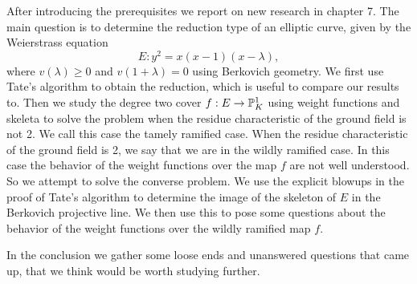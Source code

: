 \medskip


After introducing the prerequisites we report on new research in chapter 7. 
The main question is to determine the reduction type of an elliptic curve, given by the Weierstrass equation \[
	E: y^2 = x(x-1)(x-\lambda)
,\] 
where $v(\lambda) \ge 0$ and $v(1 + \lambda) = 0$ using Berkovich geometry.
We first use Tate's algorithm to obtain the reduction, which is useful to compare our results to. 
Then we study the degree two cover $f: E \to \mathbb{P}^{1}_K$ using weight functions and skeleta to solve the problem when the residue characteristic of the ground field is not 2.
We call this case the tamely ramified case. 
When the residue characteristic of the ground field is 2, we say that we are in the wildly ramified case. 
In this case the behavior of the weight functions over the map $f$ are not well understood. 
So we attempt to solve the converse problem. 
We use the explicit blowups in the proof of Tate's algorithm to determine the image of the skeleton of $E$ in the Berkovich projective line.
We then use this to pose some questions about the behavior of the weight functions over the wildly ramified map $f$. 

In the conclusion we gather some loose ends and unanswered questions that came up, that we think would be worth studying further. 


